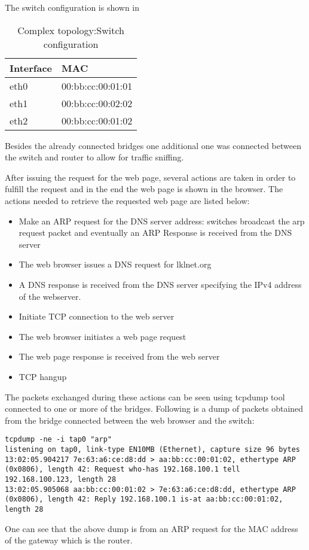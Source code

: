 The switch configuration is shown in 
\begin{center}
  \begin{table}[htb]
  \begin{center}
  \begin{tabular}{| l | l |}
    \hline
	Interface & MAC\\ \hline
	eth0 & 00:bb:cc:00:01:01\\ \hline
	eth1 & 00:bb:cc:00:02:02\\ \hline
	eth2 & 00:bb:cc:00:01:02\\
    \hline
  \end{tabular}
  \end{center}
  \caption{Complex topology:Switch configuration}
  \label{table:complex-switch}
  \end{table}
\end{center}
Besides the already connected bridges one additional one was connected between the switch and router to allow for traffic sniffing.

After issuing the request for the web page, several actions are taken in order to fulfill the request and in the end the web page is shown in the browser.
The actions needed to retrieve the requested web page are listed below:
\begin{itemize}
	\item Make an ARP request for the DNS server address: switches broadcast the arp request packet and eventually an ARP Response is received from the DNS server
	\item The web browser issues a  DNS request for lklnet.org
	\item A DNS response is received from the DNS server specifying the IPv4 address of the webserver.
	\item Initiate TCP connection to the web server
	\item The web browser initiates a web page request
	\item The web page response is received from the web server
	\item TCP hangup
\end{itemize}
The packets exchanged during these actions can be seen using tcpdump tool connected to one or more of the bridges.
Following is a dump of packets obtained from the bridge connected between the web browser and the switch:
\lstset{language=TeX,caption=,label=tcpdump}
\begin{lstlisting}
tcpdump -ne -i tap0 "arp"
listening on tap0, link-type EN10MB (Ethernet), capture size 96 bytes
13:02:05.904217 7e:63:a6:ce:d8:dd > aa:bb:cc:00:01:02, ethertype ARP (0x0806), length 42: Request who-has 192.168.100.1 tell 192.168.100.123, length 28
13:02:05.905068 aa:bb:cc:00:01:02 > 7e:63:a6:ce:d8:dd, ethertype ARP (0x0806), length 42: Reply 192.168.100.1 is-at aa:bb:cc:00:01:02, length 28
\end{lstlisting}
One can see that the above dump is from an ARP request for the MAC address of the gateway which is the router. 


